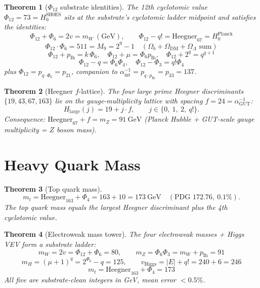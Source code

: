 \documentclass[11pt]{article}
\newtheorem{theorem}{Theorem}
\begin{document}
\begin{theorem}[$\Phi_{12}$ substrate identities]\label{thm:phi12_web}
The 12th cyclotomic value $\Phi_{12} = 73 = H_0^{\mathrm{SH0ES}}$
sits at the substrate's cyclotomic ladder midpoint and satisfies the
identities:
\[
  \Phi_{12} + \Phi_6 = 2v = m_W~\mathrm{(GeV)}, \qquad
  \Phi_{12} - q! = \mathrm{Heegner}_{67} = H_0^{\mathrm{Planck}}
\]
\[
  \Phi_{12} \cdot \Phi_6 = 511 = M_9 = 2^9-1 \quad (\Omega_b{+}\Omega_{\mathrm{DM}}{+}\Omega_\Lambda \text{ sum})
\]
\[
  \Phi_{12} + p_{\mathrm{Ih}} = k\,\Phi_6, \quad
  \Phi_{12} + \mu = \Phi_6 p_{\mathrm{Ih}}, \quad
  \Phi_{12} + 2^q = q^{q+1}
\]
\[
  \Phi_{12} - q = \Phi_6\Phi_4, \quad
  \Phi_{12} - \Phi_3 = q!\Phi_4
\]
plus $\Phi_{12} = p_{q\cdot\Phi_6} = p_{21}$, companion to
$\alpha^{-1}_{\text{int}} = p_{q\cdot p_{\mathrm{Ih}}} = p_{33} = 137$.
\end{theorem}

\begin{theorem}[Heegner $f$-lattice]\label{thm:heegner_flat}
The four large prime Heegner discriminants $\{19,43,67,163\}$ lie on
the gauge-multiplicity lattice with spacing $f = 24 = \alpha^{-1}_{\mathrm{GUT}}$:
\[
  H_{\text{large}}(j) = 19 + j \cdot f, \qquad j \in \{0,\ 1,\ 2,\ q!\}.
\]
Consequence: $\mathrm{Heegner}_{67} + f = m_Z = 91~\mathrm{GeV}$
(Planck Hubble + GUT-scale gauge multiplicity = $Z$ boson mass).
\end{theorem}

\section{Heavy Quark Mass}\label{sec:heavy_quark}

\begin{theorem}[Top quark mass]\label{thm:m_top}
\[
  m_t = \mathrm{Heegner}_{163} + \Phi_4 = 163 + 10 = 173~\mathrm{GeV}
  \quad (\text{PDG } 172.76,\ 0.1\%).
\]
The top quark mass equals the largest Heegner discriminant plus the
4th cyclotomic value.
\end{theorem}

\begin{theorem}[Electroweak mass tower]\label{thm:ew_mass_tower}
The four electroweak masses + Higgs VEV form a substrate ladder:
\[
  m_W = 2v = \Phi_{12} + \Phi_6 = 80, \qquad
  m_Z = \Phi_6 \Phi_3 = m_W + p_{\mathrm{Ih}} = 91
\]
\[
  m_H = (\mu+1)^q = 2^{\Phi_6} - q = 125, \qquad
  v_{\mathrm{Higgs}} = |E| + q! = 240 + 6 = 246
\]
\[
  m_t = \mathrm{Heegner}_{163} + \Phi_4 = 173
\]
All five are substrate-clean integers in GeV, mean error $< 0.5\%$.
\end{theorem}
\end{document}
